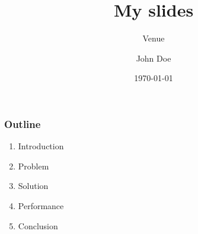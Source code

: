 \documentclass[10pt]{beamer}
\title{My slides}
\subtitle{Venue}
\date{\today}
\author{John Doe}
\begin{document}
\begin{frame}
\titlepage
\end{frame}

\begin{frame}
\frametitle{Outline}

    \begin{enumerate}
    \item Introduction
    \item Problem
    \item Solution
    \item Performance
    \item Conclusion
    \end{enumerate}

\end{frame}
\end{document}
